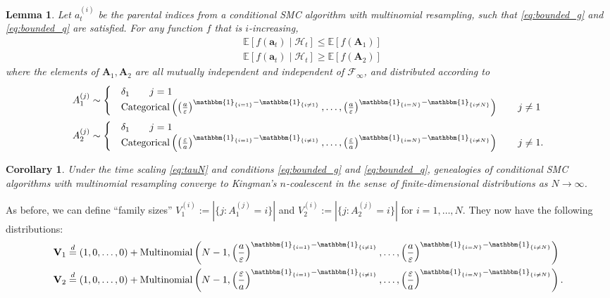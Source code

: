 \documentclass[fleqn]{article}
\newtheorem{lemma}{Lemma}
\newtheorem{corollary}{Corollary}
\theoremstyle{definition}
\newcommand{\E}{\mathbb{E}}
\newcommand{\eqdist}{\overset{d}{=}}
\newcommand{\1}[1]{\mathbbm{1}_{\{#1\}}}
\newcommand{\Cat}{\operatorname{Categorical}}
\newcommand{\Mn}{\operatorname{Multinomial}}
\begin{document}
\begin{lemma}\label{lem:i_increasing_csmc}
Let $a_t^{(i)}$ be the parental indices from a  conditional SMC algorithm with multinomial resampling, such that \eqref{eq:bounded_g} and \eqref{eq:bounded_q} are satisfied. For any function $f$ that is $i$-increasing, 
\begin{align*}
& \E[f(\mathbf{a}_t) \mid \mathcal{H}_t] \leq \E[f(\mathbf{A}_1)] \\
& \E[f(\mathbf{a}_t) \mid \mathcal{H}_t] \geq \E[f(\mathbf{A}_2)]
\end{align*}
where the elements of $\mathbf{A}_1, \mathbf{A}_2$ are all mutually independent and independent of $\mathcal{F}_{\infty}$, and distributed according to
\begin{align*}
& A_1^{(j)} \sim \begin{cases}
& \delta_1  \qquad j=1\\
& \Cat\left( \left( \frac{a}{\varepsilon} \right)^{\1{i=1} -\1{i\neq 1}} ,\dots, \left( \frac{a}{\varepsilon} \right)^{\1{i=N} -\1{i\neq N}} \right) \qquad j\neq 1
 \end{cases}\\
& A_2^{(j)} \sim \begin{cases}
& \delta_1 \qquad j=1 \\
& \Cat\left( \left( \frac{\varepsilon}{a} \right)^{\1{i=1} -\1{i\neq 1}} ,\dots, \left( \frac{\varepsilon}{a} \right)^{\1{i=N} -\1{i\neq N}} \right) \qquad j\neq 1 .
\end{cases}
\end{align*}
\end{lemma}

\begin{corollary}\label{thm:csmc_newassns}
Under the time scaling \eqref{eq:tauN} and conditions \eqref{eq:bounded_g} and \eqref{eq:bounded_q}, genealogies of conditional SMC algorithms with multinomial resampling converge to Kingman's $n$-coalescent in the sense of finite-dimensional distributions as $N\to\infty$.
\end{corollary}

As before, we can define ``family sizes'' $V_1^{(i)} := |\{j: A_1^{(j)}=i\}|$ and $V_2^{(i)} := |\{j: A_2^{(j)}=i\}|$ for $i=1,\dots,N$. They now have the following distributions:
\begin{align*}
& \mathbf{V}_1 \eqdist (1,0,\dots,0) + \Mn\left(N-1, \left( \frac{a}{\varepsilon} \right)^{\1{i=1} -\1{i\neq 1}} ,\dots, \left( \frac{a}{\varepsilon} \right)^{\1{i=N} -\1{i\neq N}} \right) \\
& \mathbf{V}_2 \eqdist (1,0,\dots, 0) + \Mn\left(N-1, \left( \frac{\varepsilon}{a} \right)^{\1{i=1} -\1{i\neq 1}} ,\dots, \left( \frac{\varepsilon}{a} \right)^{\1{i=N} -\1{i\neq N}} \right) .
\end{align*}
\end{document}
